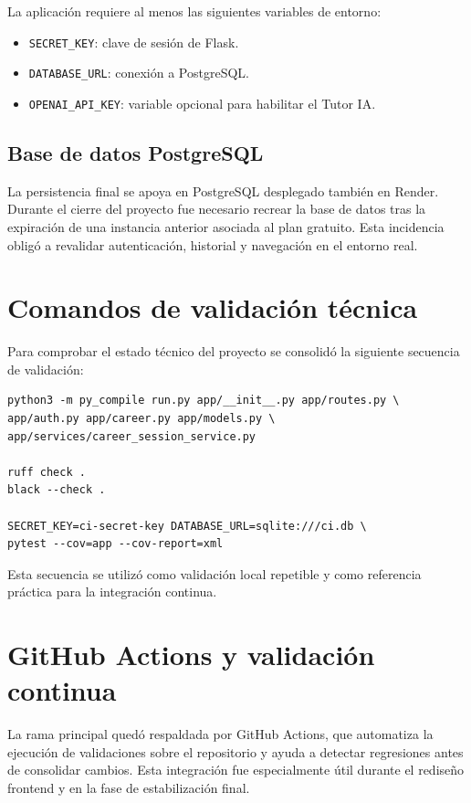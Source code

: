 La aplicación requiere al menos las siguientes variables de entorno:

\begin{itemize}
    \item \texttt{SECRET\_KEY}: clave de sesión de Flask.
    \item \texttt{DATABASE\_URL}: conexión a PostgreSQL.
    \item \texttt{OPENAI\_API\_KEY}: variable opcional para habilitar el Tutor IA.
\end{itemize}

\subsection{Base de datos PostgreSQL}

La persistencia final se apoya en PostgreSQL desplegado también en Render. Durante el cierre del proyecto fue necesario recrear la base de datos tras la expiración de una instancia anterior asociada al plan gratuito. Esta incidencia obligó a revalidar autenticación, historial y navegación en el entorno real.

\section{Comandos de validación técnica}

Para comprobar el estado técnico del proyecto se consolidó la siguiente secuencia de validación:

{\small
\begin{verbatim}
python3 -m py_compile run.py app/__init__.py app/routes.py \
app/auth.py app/career.py app/models.py \
app/services/career_session_service.py

ruff check .
black --check .

SECRET_KEY=ci-secret-key DATABASE_URL=sqlite:///ci.db \
pytest --cov=app --cov-report=xml
\end{verbatim}
}

Esta secuencia se utilizó como validación local repetible y como referencia práctica para la integración continua.

\section{GitHub Actions y validación continua}

La rama principal quedó respaldada por GitHub Actions, que automatiza la ejecución de validaciones sobre el repositorio y ayuda a detectar regresiones antes de consolidar cambios. Esta integración fue especialmente útil durante el rediseño frontend y en la fase de estabilización final.

